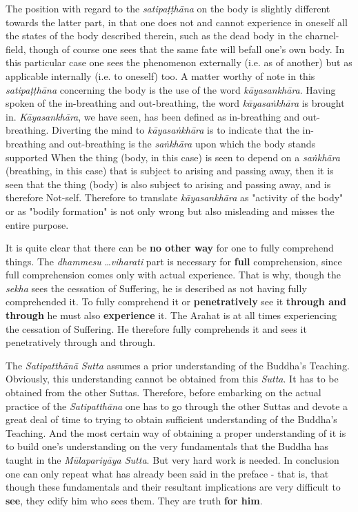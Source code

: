 The position with regard to the \emph{satipaṭṭhāna} on the body is slightly
different towards the latter part, in that one does not and cannot
experience in oneself all the states of the body described therein, such
as the dead body in the charnel-field, though of course one sees that
the same fate will befall one’s own body. In this particular case one
sees the phenomenon externally (i.e. as of another) but as applicable
internally (i.e. to oneself) too. A matter worthy of note in this
\emph{satipaṭṭhāna} concerning the body is the use of the word
\emph{kāyasankhāra}. Having spoken of the in-breathing and out-breathing,
the word \emph{kāyasaṅkhāra} is brought in. \emph{Kāyasankhāra}, we have seen,
has been defined as in-breathing and out-breathing. Diverting the mind
to \emph{kāyasaṅkhāra} is to indicate that the in-breathing and out-breathing
is the \emph{saṅkhāra} upon which the body stands supported When the thing
(body, in this case) is seen to depend on a \emph{saṅkhāra} (breathing, in
this case) that is subject to arising and passing away, then it is seen
that the thing (body) is also subject to arising and passing away, and
is therefore Not-self. Therefore to translate \emph{kāyasankhāra} as
"activity of the body" or as "bodily formation" is not only wrong but
also misleading and misses the entire purpose.


It is quite clear that there can be \textbf{no other way} for one to fully
comprehend things. The \emph{dhammesu} …​ \emph{viharati} part is necessary for
\textbf{full} comprehension, since full comprehension comes only with actual
experience. That is why, though the \emph{sekha} sees the cessation of
Suffering, he is described as not having fully comprehended it. To fully
comprehend it or \textbf{penetratively} see it \textbf{through and through} he must
also \textbf{experience} it. The Arahat is at all times experiencing the
cessation of Suffering. He therefore fully comprehends it and sees it
penetratively through and through.


\label{truth-for-him}The \emph{Satipatthānā Sutta} assumes a prior understanding of the Buddha’s
Teaching. Obviously, this understanding cannot be obtained from this
\emph{Sutta}. It has to be obtained from the other Suttas. Therefore,
before embarking on the actual practice of the \emph{Satipatthāna} one has to
go through the other Suttas and devote a great deal of time to trying
to obtain sufficient understanding of the Buddha’s Teaching. And the
most certain way of obtaining a proper understanding of it is to build
one’s understanding on the very fundamentals that the Buddha has taught
in the \emph{Mūlapariyāya Sutta}. But very hard work is needed. In
conclusion one can only repeat what has already been said in the preface
- that is, that though these fundamentals and their resultant
implications are very difficult to \textbf{see}, they edify him who sees
them. They are truth \textbf{for him}.


